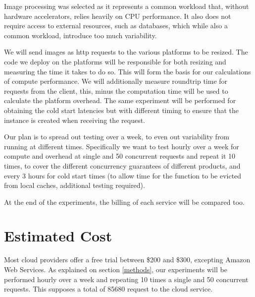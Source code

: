 \documentclass[11pt]{article}
\begin{document}
Image processing was selected as it represents a common workload that, without hardware accelerators, relies heavily on CPU performance. It also does not require access to external resources, such as databases, which while also a common workload, introduce too much variability.

We will send images as http requests to the various platforms to be resized. The code we deploy on the platforms will be responsible for both resizing and measuring the time it takes to do so. This will form the basis for our calculations of compute performance. We will additionally measure roundtrip time for requests from the client, this, minus the computation time will be used to calculate the platform overhead.  The same experiment will be performed for obtaining the cold start latencies but with different timing to ensure that the instance is created when receiving the request.

Our plan is to spread out testing over a week, to even out variability from running at different times. Specifically we want to test hourly over a week for compute and overhead at single and 50 concurrent requests and repeat it 10 times, to cover the different concurrency guarantees of different products, and every 3 hours for cold start times (to allow time for the function to be evicted from local caches, additional testing required).

At the end of the experiments, the billing of each service will be compared too.


\section{Estimated Cost}
Most cloud providers offer a free trial between \$200 and \$300, excepting Amazon Web Services. As explained on section \ref{methods}, our experiments will be performed hourly over a week and repeating 10 times a single and 50 concurrent requests. This supposes a total of 85680 request to the cloud service.
\end{document}

